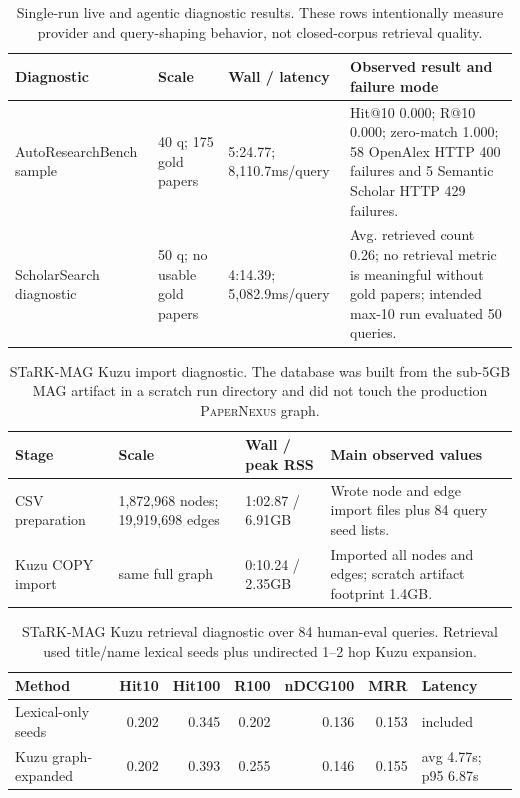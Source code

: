 \documentclass[11pt]{article}
\newcommand{\papernexus}{\textsc{PaperNexus}}
\begin{document}
\begin{table}[t]
\centering
\caption{Single-run live and agentic diagnostic results. These rows intentionally measure provider and query-shaping behavior, not closed-corpus retrieval quality.}
\label{tab:sub5g-live-diagnostics}
\footnotesize
\begin{tabularx}{\linewidth}{@{}l l l Y@{}}
\toprule
Diagnostic & Scale & Wall / latency & Observed result and failure mode \\
\midrule
AutoResearchBench sample~\citep{autoresearchbench} & 40 q; 175 gold papers & 5:24.77; 8,110.7ms/query & Hit@10 0.000; R@10 0.000; zero-match 1.000; 58 OpenAlex HTTP 400 failures and 5 Semantic Scholar HTTP 429 failures. \\
ScholarSearch diagnostic~\citep{scholarsearch} & 50 q; no usable gold papers & 4:14.39; 5,082.9ms/query & Avg. retrieved count 0.26; no retrieval metric is meaningful without gold papers; intended max-10 run evaluated 50 queries. \\
\bottomrule
\end{tabularx}
\end{table}

\begin{table}[t]
\centering
\caption{STaRK-MAG Kuzu import diagnostic. The database was built from the sub-5GB MAG artifact in a scratch run directory and did not touch the production \papernexus{} graph.}
\label{tab:stark-kuzu-import}
\footnotesize
\begin{tabularx}{\linewidth}{@{}l l l Y@{}}
\toprule
Stage & Scale & Wall / peak RSS & Main observed values \\
\midrule
CSV preparation & 1,872,968 nodes; 19,919,698 edges & 1:02.87 / 6.91GB & Wrote node and edge import files plus 84 query seed lists. \\
Kuzu COPY import & same full graph & 0:10.24 / 2.35GB & Imported all nodes and edges; scratch artifact footprint 1.4GB. \\
\bottomrule
\end{tabularx}
\end{table}

\begin{table}[t]
\centering
\caption{STaRK-MAG Kuzu retrieval diagnostic over 84 human-eval queries. Retrieval used title/name lexical seeds plus undirected 1--2 hop Kuzu expansion.}
\label{tab:stark-kuzu-diagnostic}
\footnotesize
\begin{tabular}{@{}l r r r r r l@{}}
\toprule
Method & Hit10 & Hit100 & R100 & nDCG100 & MRR & Latency \\
\midrule
Lexical-only seeds & 0.202 & 0.345 & 0.202 & 0.136 & 0.153 & included \\
Kuzu graph-expanded & 0.202 & 0.393 & 0.255 & 0.146 & 0.155 & avg 4.77s; p95 6.87s \\
\bottomrule
\end{tabular}
\end{table}
\end{document}
